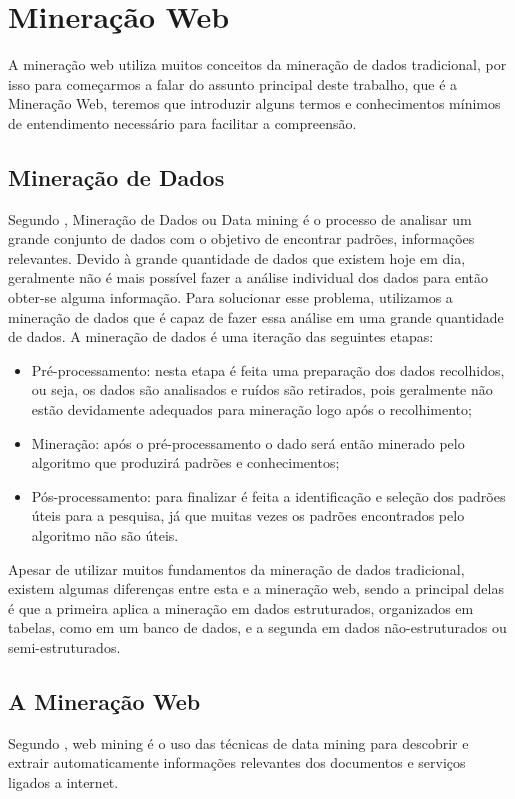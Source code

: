 \chapter{Mineração Web}
A mineração web utiliza muitos conceitos da mineração de dados tradicional, por isso para começarmos a falar do assunto principal deste trabalho, que é a Mineração Web, teremos que introduzir alguns termos e conhecimentos mínimos de entendimento necessário para facilitar a compreensão.

\section{Mineração de Dados}

	Segundo \cite{BingLiu}, Mineração de Dados ou Data mining é o processo de analisar um grande conjunto de dados com o objetivo de encontrar padrões, informações relevantes. Devido à grande quantidade de dados que existem hoje em dia, geralmente não é mais possível fazer a análise individual dos dados para então obter-se alguma informação. Para solucionar esse problema, utilizamos a mineração de dados  que é capaz de fazer essa análise em uma grande quantidade de dados. A mineração de dados é uma iteração das seguintes etapas:

\begin{itemize}
\item 	Pré-processamento: nesta etapa é feita uma preparação dos dados recolhidos, ou seja, os dados são analisados e ruídos são retirados, pois geralmente não estão devidamente adequados para mineração logo após o recolhimento;
\item 	Mineração: após o pré-processamento o dado será então minerado pelo algoritmo que produzirá padrões e conhecimentos;
\item  	Pós-processamento: para finalizar é feita a identificação e seleção dos padrões úteis para a pesquisa, já que muitas vezes os padrões encontrados pelo algoritmo não são úteis.
\end{itemize}

Apesar de utilizar muitos fundamentos da mineração de dados tradicional, existem algumas diferenças entre esta e a mineração web, sendo a principal delas é que a primeira aplica a mineração em dados estruturados, organizados em tabelas, como em um banco de dados, e a segunda em dados não-estruturados ou semi-estruturados.


\section{A Mineração Web}
	Segundo \cite{BingLiu}, web mining é o uso das técnicas de data mining para descobrir e extrair automaticamente informações relevantes dos documentos e serviços ligados a internet.

